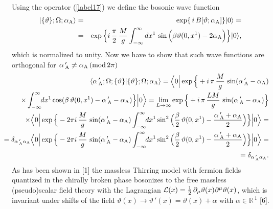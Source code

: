 \documentclass[a4paper,12pt] {article}
\begin{document}
Using the operator (\ref{label17}) we define the bosonic wave function
%
\begin{eqnarray}\label{label25}
|\{\vartheta\};\Omega; \alpha_{\rm A}\rangle &=&
\exp\{\,i\,B[\vartheta; \alpha_{\rm A}]\}|0\rangle =\nonumber\\ &=&
\exp\Big\{i\,\frac{\pi}{2}\,\frac{M}{g}
\int^{\infty}_{-\infty}dx^1\,\sin\Big(\beta\vartheta(0,x^1) -
2\alpha_{\rm A}\Big)\Big\}|0\rangle,
\end{eqnarray}
%
which is normalized to unity. Now we have to show that such wave
functions are orthogonal for $\alpha\,'_{\rm A} \neq \alpha_{\rm
A}\,({\rm mod}\,2\pi)$
%
\begin{eqnarray}\label{label26}
\hspace{-0.3in}&&\langle \alpha\,'_{\rm A}; \Omega;
\{\vartheta\}|\{\vartheta\};\Omega; \alpha_{\rm A}\rangle =\Big\langle
0\Big|\exp\Big\{+i\,\pi\,\frac{M}{g}\,\sin(\alpha\,'_{\rm A} -
\alpha_{\rm A}) \nonumber\\
\hspace{-0.3in}&&\times\int^{\infty}_{-\infty}\!\!
dx^1\cos(\beta\,\vartheta(0,x^1) - \alpha\,'_{\rm A} - \alpha_{\rm
A})\Big\}\Big|0\Big\rangle = \lim_{L\to
\infty}\exp\Big\{+i\,\pi\,\frac{LM}{g}\,\sin(\alpha\,'_{\rm A} -
\alpha_{\rm A})\Big\}\nonumber\\
\hspace{-0.3in}&&\times \Big\langle 0\Big|\exp\Big\{- 2\pi
i\,\frac{M}{g}\,\sin(\alpha\,'_{\rm A} - \alpha_{\rm A})
\int^{\infty}_{-\infty}\!\!dx^1\sin^2\Big(\frac{\beta}{2}\,
\vartheta(0,x^1) - \frac{\alpha\,'_{\rm A} + \alpha_{\rm
A}}{2}\Big)\Big\}\Big|0\Big\rangle =\nonumber\\
\hspace{-0.3in}&&= \delta_{\alpha\,'_{\rm A}\alpha_{\rm A}}\Big\langle
0\Big|\exp\Big\{- 2\pi i\,\frac{M}{g}\,\sin(\alpha\,'_{\rm A} -
\alpha_{\rm A})
\int^{\infty}_{-\infty}\!\!dx^1\sin^2\Big(\frac{\beta}{2}\,
\vartheta(0,x^1) - \frac{\alpha\,'_{\rm A} + \alpha_{\rm
A}}{2}\Big)\Big\}\Big|0\Big\rangle=\nonumber\\
\hspace{-0.3in}&&= \delta_{\alpha\,'_{\rm A}\alpha_{\rm A}}.
\end{eqnarray}
%
As has been shown in [1] the massless Thirring model with fermion
fields quantized in the chirally broken phase bosonizes to the free
massless (pseudo)scalar field theory with the Lagrangian ${\cal L}(x)
= \frac{1}{2}\,\partial_{\mu}\vartheta(x)\partial^{\mu}\vartheta(x)$,
which is invariant under shifts of the field $\vartheta(x) \to
\vartheta\,'(x) = \vartheta(x) + \alpha$ with $\alpha \in
\mathbb{R}^{\,1}$ [6].
\end{document}
